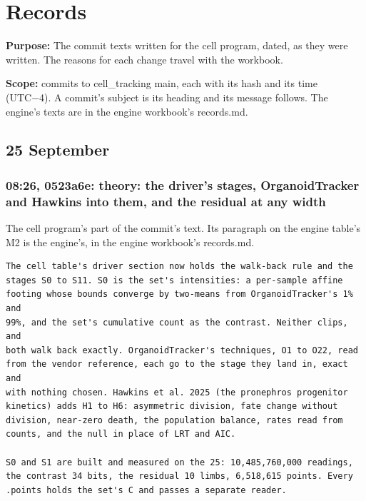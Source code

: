 \chapter{\texorpdfstring{Records}{Records}}
\label{chap:records}

\textbf{Purpose:} The commit texts written for the cell program, dated, as they were written. The reasons for each change travel with the workbook.

\textbf{Scope:} commits to cell\_\allowbreak{}tracking main, each with its hash and its time (UTC−4). A commit's subject is its heading and its message follows. The engine's texts are in the engine workbook's records.md.

\section{\texorpdfstring{25 September}{25 September}}

\subsection{\texorpdfstring{08:26, 0523a6e: theory: the driver's stages, OrganoidTracker and Hawkins into them, and the residual at any width}{08:26, 0523a6e: theory: the driver's stages, OrganoidTracker and Hawkins into them, and the residual at any width}}

The cell program's part of the commit's text. Its paragraph on the engine table's M2 is the engine's, in the engine workbook's records.md.

\begin{Verbatim}
The cell table's driver section now holds the walk-back rule and the
stages S0 to S11. S0 is the set's intensities: a per-sample affine
footing whose bounds converge by two-means from OrganoidTracker's 1% and
99%, and the set's cumulative count as the contrast. Neither clips, and
both walk back exactly. OrganoidTracker's techniques, O1 to O22, read
from the vendor reference, each go to the stage they land in, exact and
with nothing chosen. Hawkins et al. 2025 (the pronephros progenitor
kinetics) adds H1 to H6: asymmetric division, fate change without
division, near-zero death, the population balance, rates read from
counts, and the null in place of LRT and AIC.

S0 and S1 are built and measured on the 25: 10,485,760,000 readings,
the contrast 34 bits, the residual 10 limbs, 6,518,615 points. Every
.points holds the set's C and passes a separate reader.
\end{Verbatim}
